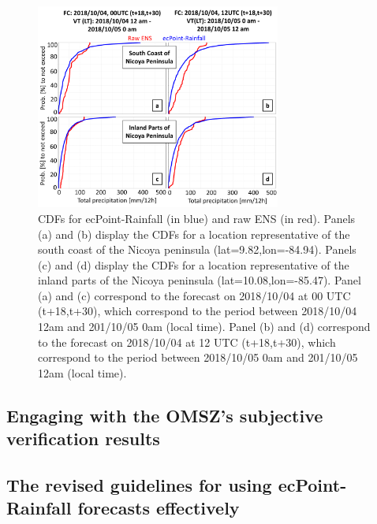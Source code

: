 \documentclass[twocol]{ametsocV5} %
\begin{document}
\begin{figure}
\centerline{\includegraphics[width=19pc]{manuscript/Figures/Results_CaseStudy_CDFs_CR.png}}
\caption{CDFs for ecPoint-Rainfall (in blue) and raw ENS (in red). Panels (a) and (b) display the CDFs for a location representative of the south coast of the Nicoya peninsula (lat=9.82,lon=-84.94). Panels (c) and (d) display the CDFs for a location representative of the inland parts of the Nicoya peninsula (lat=10.08,lon=-85.47). Panel (a) and (c) correspond to the forecast on 2018/10/04 at 00 UTC (t+18,t+30), which correspond to the period between 2018/10/04 12am and 201/10/05 0am (local time). Panel (b) and (d) correspond to the forecast on 2018/10/04 at 12 UTC (t+18,t+30), which correspond to the period between 2018/10/05 0am and 201/10/05 12am (local time).}
\label{Results_CaseStudy_CDFs_CR}
\end{figure}



\subsection{Engaging with the OMSZ's subjective verification results}



\subsection{The revised guidelines for using ecPoint-Rainfall forecasts effectively}
\end{document}

